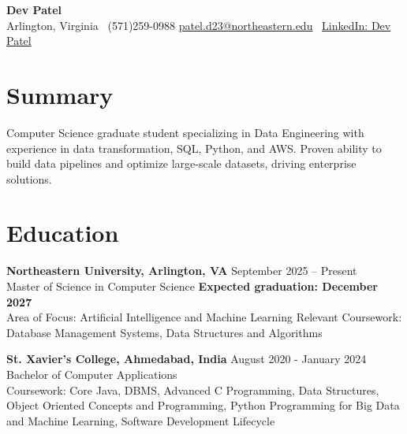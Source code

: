 \documentclass[a4paper,10pt]{article}
\begin{document}
\begin{center}
\vspace{-3mm}
    \fontsize{16}{18}\selectfont \textbf{Dev Patel} \\
    \vspace{0mm}
    \normalsize Arlington, Virginia \textbar\ (571)259-0988  \textbar       \href{mailto:patel.d23@northeastern.edu}{patel.d23@northeastern.edu} \textbar\ \href{https://www.linkedin.com/in/devxpatel//}{LinkedIn: Dev Patel} \\
\end{center}



\section*{Summary}
Computer Science graduate student specializing in Data Engineering with experience in data transformation, SQL, Python, and AWS. Proven ability to build data pipelines and optimize large-scale datasets, driving enterprise solutions.
 
\vspace{ 0 mm}
\section*{Education}
\textbf{Northeastern University, Arlington, VA} \hfill September 2025 -- Present\\
Master of Science in Computer Science \hfill \textbf{Expected graduation: December 2027} \\
Area of Focus: Artificial Intelligence and Machine Learning
Relevant Coursework: Database Management Systems, Data Structures and Algorithms

\vspace{1 mm} %
\textbf{St. Xavier's College, Ahmedabad, India} \hfill August 2020 - January 2024 \\
Bachelor of Computer Applications\\
Coursework: Core Java, DBMS, Advanced C Programming, Data Structures, Object Oriented Concepts and Programming, Python Programming for Big Data and Machine Learning, Software Development Lifecycle
\end{document}
